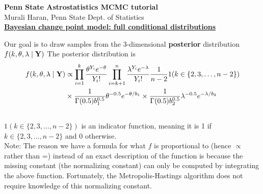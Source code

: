 \documentclass[11pt]{article}
\begin{document}
\pagestyle{empty}
\begin{center}
\Large
{\bf Penn State Astrostatistics MCMC tutorial} \\
\large
Murali Haran, Penn State Dept. of Statistics \\\vspace{0.2in}
{\bf  \underline{Bayesian change point model: full conditional distributions}}\\
\end{center}
Our goal is to draw samples from the 3-dimensional
{\bf posterior} distribution $f(k,\theta,\lambda\mid {\bf Y})$  The posterior distribution is 
\begin{equation}\label{joint}
\begin{split}
f(k,\theta,\lambda \mid {\bf Y}) & \propto \prod_{i=1}^k
\frac{\theta^{Y_i} e^{-\theta}}{Y_i !} \prod_{i=k+1}^n
\frac{\lambda^{Y_i} e^{-\lambda}}{Y_i !} \frac{1}{n-2} 1 (k\in
\{2,3,\dots, n-2\})\\
& \times  \frac{1}{\Gamma(0.5)b_1^{0.5}} \theta^{-0.5} e^{-\theta/b_1}
\times \frac{1}{\Gamma(0.5)b_2^{0.5}} \lambda^{-0.5}
e^{-\lambda/b_2}\\
& 
\end{split}
\end{equation}
$1 (k\in \{2,3,\dots, n-2\}) $ is an indicator function, meaning it is
1 if $k \in \{2,3,\dots, n-2\}$ and 0 otherwise. \\
Note: The reason we have a formula for what $f$ is proportional to
(hence $\propto$ rather than =) instead of an exact description of the 
function is because the missing constant (the normalizing constant)
can only be computed by integrating the above function. Fortunately,
the Metropolis-Hastings algorithm does not require knowledge of this 
normalizing constant.\\
\end{document}
